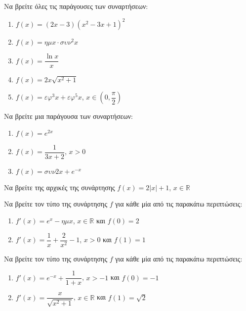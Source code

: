 \documentclass{presentation}
\begin{document}
\begin{askisi}
    Να βρείτε όλες τις παράγουσες των συναρτήσεων:
    \begin{enumerate}[<+->]
        \item $f(x)=(2x-3)(x^2-3x+1)^2$
        \item $f(x)=ημx\cdot συν^2x$
        \item $f(x)=\dfrac{\ln x}{x}$
        \item $f(x)=2x\sqrt{x^2+1}$
        \item $f(x)=εφ^3x+εφ^5x$, $x\in \left( 0,\dfrac{π}{2} \right)$
    \end{enumerate}
\end{askisi}

\begin{askisi}
    Να βρείτε μια παράγουσα των συναρτήσεων:
    \begin{enumerate}[<+->]
        \item $f(x)=e^{2x}$
        \item $f(x)=\dfrac{1}{3x+2}$, $x>0$
        \item $f(x)=συν2x+e^{-x}$
    \end{enumerate}
\end{askisi}

\begin{askisi}
    Να βρείτε της αρχικές της συνάρτησης $f(x)=2|x|+1$, $x\in\mathbb{R}$
\end{askisi}

\begin{askisi}
    Να βρείτε τον τύπο της συνάρτησης $f$ για κάθε μία από τις παρακάτω περιπτώσεις:
    \begin{enumerate}[<+->]
        \item $f'(x)=e^x-ημx$, $x\in\mathbb{R}$ και $f(0)=2$
        \item $f'(x)=\dfrac{1}{x}+\dfrac{2}{x^2}-1$, $x>0$ και $f(1)=1$
    \end{enumerate}
\end{askisi}

\begin{askisi}
    Να βρείτε τον τύπο της συνάρτησης $f$ για κάθε μία από τις παρακάτω περιπτώσεις:
    \begin{enumerate}[<+->]
        \item $f'(x)=e^{-x}+\dfrac{1}{1+x}$, $x>-1$ και $f(0)=-1$
        \item $f'(x)=\dfrac{x}{\sqrt{x^2+1}}$, $x\in\mathbb{R}$ και $f(1)=\sqrt{2}$
    \end{enumerate}
\end{askisi}
\end{document}
